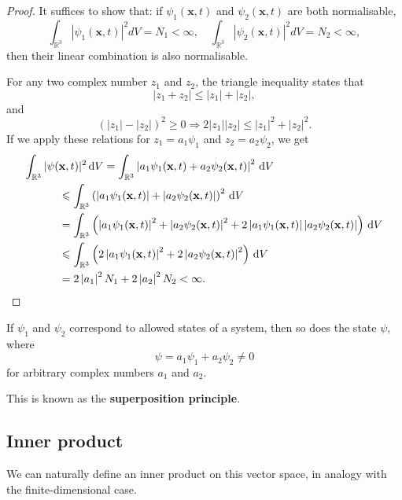 \documentclass[a4paper]{article}
\begin{document}
\begin{proof}
    It suffices to show that: if $\psi_1(\mathbf{x}, t)$ and $\psi_2(\mathbf{x}, t)$ are both normalisable,
    \[
    \int_{\mathbb{R}^3}\left|\psi_1(\mathbf{x}, t)\right|^2 d V=N_1<\infty, \quad \int_{\mathbb{R}^3}\left|\psi_2(\mathbf{x}, t)\right|^2 d V=N_2<\infty,
    \]
    then their linear combination is also normalisable.

    For any two complex number $z_1$ and $z_2$, the triangle inequality states that
    \[
    \left|z_1+z_2\right| \leq\left|z_1\right|+\left|z_2\right|,
    \]
    and
    \[
    \left(\left|z_1\right|-\left|z_2\right|\right)^2 \geq 0 \Rightarrow 2\left|z_1\right|\left|z_2\right| \leq\left|z_1\right|^2+\left|z_2\right|^2 .
    \]
    If we apply these relations for $z_1=a_1 \psi_1$ and $z_2=a_2 \psi_2$, we get
    \begin{align*}
        \int_{\mathbb{R}^3}|\psi(&\mathbf{x}, t)|^2 \,\mathrm{d} V =\int_{\mathbb{R}^3}\left|a_1 \psi_1(\mathbf{x}, t)+a_2 \psi_2(\mathbf{x}, t)\right|^2 \,\mathrm{d} V \\
        & \leqslant \int_{\mathbb{R}^3}\left(\left|a_1 \psi_1(\mathbf{x}, t)\right|+\left|a_2 \psi_2(\mathbf{x}, t)\right|\right)^2 \,\mathrm{d} V \\
        &=\int_{\mathbb{R}^3}\left(\left|a_1 \psi_1(\mathbf{x}, t)\right|^2+\left|a_2 \psi_2(\mathbf{x}, t)\right|^2+2\left|a_1 \psi_1(\mathbf{x}, t)\right|\left|a_2 \psi_2(\mathbf{x}, t)\right|\right) \,\mathrm{d} V \\
        & \leqslant \int_{\mathbb{R}^3}\left(2\left|a_1 \psi_1(\mathbf{x}, t)\right|^2+2\left|a_2 \psi_2(\mathbf{x}, t)\right|^2\right) \,\mathrm{d} V \\
        &=2\left|a_1\right|^2 N_1+2\left|a_2\right|^2 N_2<\infty .\qedhere
    \end{align*}
\end{proof}

\begin{corollary}
    If $\psi_1$ and $\psi_2$ correspond to allowed states of a system, then so does the state $\psi$, where
    \[
    \psi=a_1 \psi_1+a_2 \psi_2 \neq 0
    \]
    for arbitrary complex numbers $a_1$ and $a_2$. 
\end{corollary}
This is known as the \textbf{superposition principle}.

\subsection{Inner product}
We can naturally define an inner product on this vector space, in analogy with the finite-dimensional case.
\end{document}
